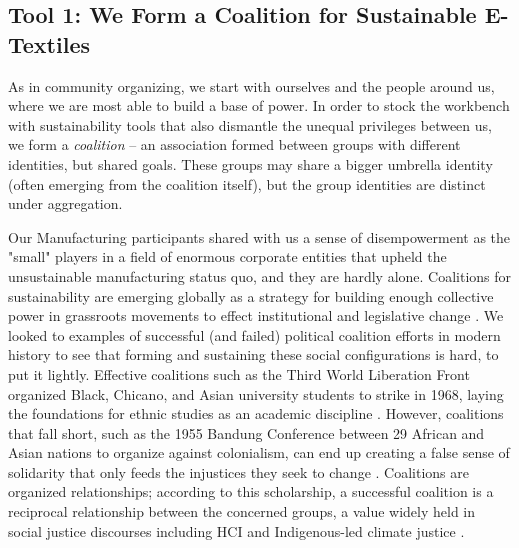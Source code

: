 \subsection{Tool 1: We Form a Coalition for Sustainable E-Textiles}
As in community organizing, we start with ourselves and the people around us, where we are most able to build a base of power.
 In order to stock the workbench with sustainability tools that also dismantle the unequal privileges between us, we form a \textit{coalition} -- 
an association formed between groups with different identities, but shared goals. 
These groups may share a bigger umbrella identity (often emerging from the coalition itself), but the group identities are distinct under aggregation. 

Our Manufacturing participants shared with us a sense of disempowerment as the "small" players in a field of enormous corporate entities that upheld the unsustainable manufacturing status quo, and they are hardly alone. Coalitions for sustainability are emerging globally as a strategy for building enough collective power in grassroots movements to effect institutional and legislative change \cite{noauthor_movement_nodate, hess_sustainability_2014}. We looked to examples of successful (and failed) political coalition efforts in modern history to see that forming and sustaining these social configurations is hard, to put it lightly. Effective coalitions such as the Third World Liberation Front organized Black, Chicano, and Asian university students to  strike in 1968, laying the foundations for ethnic studies as an academic discipline \cite{npr_student_nodate}. However, coalitions that fall short, such as the 1955 Bandung Conference between 29 African and Asian nations to organize against colonialism, can end up creating a false sense of solidarity that only feeds the injustices they seek to change \cite{nopper_illusion_2015}. Coalitions are organized relationships; according to this scholarship, a successful coalition is a reciprocal relationship between the concerned groups, a value widely held in social justice discourses including HCI \cite{dombrowski_social_2016} and Indigenous-led climate justice \cite{hobart_radical_2020, whyte_indigenous_2017, gomez-barris_extractive_2017}.

